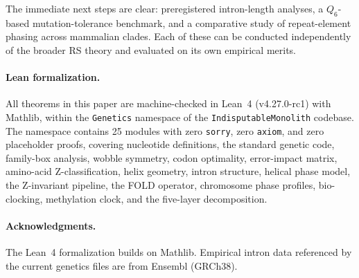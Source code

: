 \documentclass[11pt,a4paper]{article}
\newcommand{\Qsix}{\ensuremath{Q_6}}
\begin{document}
The immediate next steps are clear: preregistered intron-length analyses, a \Qsix{}-based mutation-tolerance benchmark, and a comparative study of repeat-element phasing across mammalian clades. Each of these can be conducted independently of the broader RS theory and evaluated on its own empirical merits.

\paragraph{Lean formalization.}
All theorems in this paper are machine-checked in Lean~4 (v4.27.0-rc1) with Mathlib, within the \texttt{Genetics} namespace of the \texttt{IndisputableMonolith} codebase. The namespace contains 25 modules with zero \texttt{sorry}, zero \texttt{axiom}, and zero placeholder proofs, covering nucleotide definitions, the standard genetic code, family-box analysis, wobble symmetry, codon optimality, error-impact matrix, amino-acid Z-classification, helix geometry, intron structure, helical phase model, the Z-invariant pipeline, the FOLD operator, chromosome phase profiles, bio-clocking, methylation clock, and the five-layer decomposition.

\paragraph{Acknowledgments.}
The Lean~4 formalization builds on Mathlib. Empirical intron data referenced by the current genetics files are from Ensembl (GRCh38).
\end{document}
